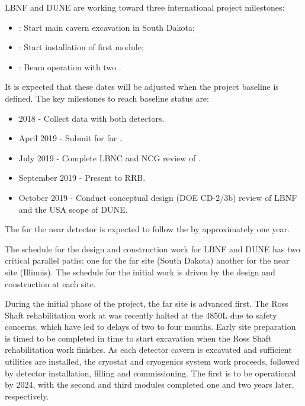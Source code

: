 LBNF and DUNE are working toward three international project milestones:
\begin{itemize}
\item \maincavernstartexc{}: Start main cavern excavation in South Dakota; %
\item \firstfdmodstartinstall{}: Start installation of first  module; 
\item \beamturnon{}: Beam operation with two .
\end{itemize}
It is expected that these dates will be adjusted when the project baseline is defined. The key milestones to reach baseline status are:
\begin{itemize}
\item 2018 - Collect data with both  detectors.
\item April 2019 - Submit  for far .
\item July 2019 - Complete LBNC and NCG review of .
\item September 2019 - Present  to RRB.
\item October 2019 - Conduct conceptual design (DOE CD-2/3b) review of LBNF and the USA scope of DUNE.
\end{itemize}
The  for the near detector is expected to follow the   by approximately one year.

The schedule for the design and construction work for LBNF and DUNE has two critical parallel paths: one for the %
far site (South Dakota) %
another for the %
near site (Illinois). %
The schedule for the initial work is driven by the  design and construction at each site.

During the initial phase of the project, the far site  is advanced first. The Ross Shaft rehabilitation
work at \surf was recently halted at the 4850L due to safety concerns, which have led to delays of two to four months. Early site preparation is timed to be completed 
in time to start excavation when the Ross Shaft rehabilitation work finishes. As each detector 
 cavern is excavated and sufficient utilities are installed, the cryostat and cryogenics system work proceeds, followed by detector installation, filling and commissioning. 
The first  is to be operational by 2024, with the second and third modules completed one and two years later, respectively.

